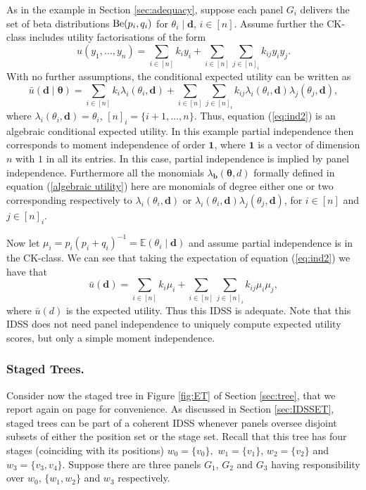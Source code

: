 As in the example in Section \ref{sec:adequacy}, suppose each panel $G_i$ delivers the set of beta distributions $\textnormal{Be}(p_i,q_i)$ for $\theta_i\;|\;\bm{d}$, $i\in[n]$.  Assume further the CK-class includes utility factorisations of the form
\begin{equation*}
\label{eq:ind1}
u(y_1,\dots, y_n)=\sum_{i\in[n]}k_iy_i+\sum_{i\in[n]}\sum_{j\in[n]_i}k_{ij}y_iy_j.
\end{equation*}
With no further assumptions, the conditional expected utility can be written as
\begin{equation}
\label{eq:ind2}
\bar{u}(\bm{d}\;|\;\bm{\theta})=\sum_{i\in[n]}k_i\lambda_i(\theta_i,\bm{d})+\sum_{i\in[n]}\sum_{j\in[n]_i}k_{ij}\lambda_i(\theta_i,\bm{d})\lambda_j(\theta_j,\bm{d}),
\end{equation}
where $\lambda_i(\theta_i,\bm{d})=\theta_i$, $[n]_i=\{i+1,\dots,n\}$. Thus,  equation (\ref{eq:ind2}) is an algebraic conditional expected utility. In this example  partial independence then corresponds to moment independence of order $\bm{1}$, where $\bm{1}$ is a vector of dimension $n$ with $1$ in all its entries. In this case, partial independence is implied by panel independence. Furthermore all the monomials $\lambda_{\bm{b}}(\bm{\theta},d)$ formally defined in equation (\ref{algebraic utility}) here are monomials of degree  either  one or two corresponding respectively to $\lambda_i(\theta_i,\bm{d})$ or $\lambda_i(\theta_i,\bm{d})\lambda_j(\theta_j,\bm{d})$, for $i\in[n]$ and $j\in[n]_i$.

Now let $\mu_i=p_i(p_i+q_i)^{-1}=\mathbb{E}(\theta_i\;|\;\bm{d})$ and assume partial independence is in the CK-class. We can see that taking the expectation of equation (\ref{eq:ind2}) we have that
\begin{equation*}
\label{eq:ind3}
\bar{u}(\bm{d})=\sum_{i\in[n]}k_i\mu_i+\sum_{i\in[n]}\sum_{j\in[n]_i}k_{ij}\mu_i\mu_j,
\end{equation*}
where $\bar{u}(d)$ is the expected utility. Thus this IDSS is adequate. Note that this IDSS does not need panel independence to uniquely compute expected utility scores, but only a simple moment independence. 


\subsubsection{Staged Trees.}
Consider now the staged tree in Figure \ref{fig:ET} of Section \ref{sec:tree}, that we report again on page \pageref{riporto} for convenience. As discussed in Section \ref{sec:IDSSET}, staged trees can be part of a coherent IDSS whenever panels oversee disjoint subsets of either the position set or the stage set. Recall that this tree has four stages (coinciding with its positions) $w_0=\{v_0\},$ $w_1=\{v_1\}$, $w_2=\{v_2\}$ and $w_3=\{v_3,v_4\}$. Suppose there are three panels $G_1$, $G_2$ and $G_3$ having responsibility over $w_0$, $\{w_1,w_2\}$ and $w_3$ respectively.

